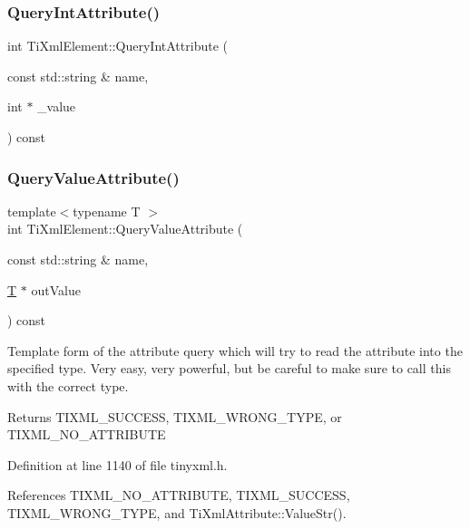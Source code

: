 \subsubsection{\texorpdfstring{Query\+Int\+Attribute()}{QueryIntAttribute()}\hspace{0.1cm}{\footnotesize\ttfamily [2/2]}}
{\footnotesize\ttfamily int Ti\+Xml\+Element\+::\+Query\+Int\+Attribute (\begin{DoxyParamCaption}\item[{const std\+::string \&}]{name,  }\item[{int $\ast$}]{\+\_\+value }\end{DoxyParamCaption}) const}

\hypertarget{class_ti_xml_element_a7530db879b81ebaba61bf62a9770d204}{}\label{class_ti_xml_element_a7530db879b81ebaba61bf62a9770d204} 
\subsubsection{\texorpdfstring{Query\+Value\+Attribute()}{QueryValueAttribute()}}
{\footnotesize\ttfamily template$<$typename T $>$ \\
int Ti\+Xml\+Element\+::\+Query\+Value\+Attribute (\begin{DoxyParamCaption}\item[{const std\+::string \&}]{name,  }\item[{\hyperlink{class_t}{T} $\ast$}]{out\+Value }\end{DoxyParamCaption}) const\hspace{0.3cm}{\ttfamily [inline]}}

Template form of the attribute query which will try to read the attribute into the specified type. Very easy, very powerful, but be careful to make sure to call this with the correct type.

\begin{DoxyReturn}{Returns}
T\+I\+X\+M\+L\+\_\+\+S\+U\+C\+C\+E\+SS, T\+I\+X\+M\+L\+\_\+\+W\+R\+O\+N\+G\+\_\+\+T\+Y\+PE, or T\+I\+X\+M\+L\+\_\+\+N\+O\+\_\+\+A\+T\+T\+R\+I\+B\+U\+TE 
\end{DoxyReturn}


Definition at line 1140 of file tinyxml.\+h.



References T\+I\+X\+M\+L\+\_\+\+N\+O\+\_\+\+A\+T\+T\+R\+I\+B\+U\+TE, T\+I\+X\+M\+L\+\_\+\+S\+U\+C\+C\+E\+SS, T\+I\+X\+M\+L\+\_\+\+W\+R\+O\+N\+G\+\_\+\+T\+Y\+PE, and Ti\+Xml\+Attribute\+::\+Value\+Str().

